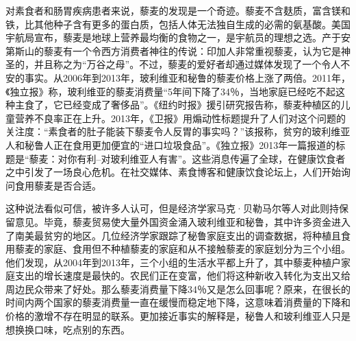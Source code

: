 \documentclass{exam-zh}
\begin{document}
\begin{material}[source={（摘编自赫克托·麦克唐纳《后真相时代》，刘清山译）}]
对素食者和肠胃疾病患者来说，藜麦的发现是一个奇迹。藜麦不含麸质，富含镁和铁，比其他种子含有更多的蛋白质，包括人体无法独自生成的必需的氨基酸。美国宇航局宣布，藜麦是地球上营养最均衡的食物之一，是宇航员的理想之选。产于安第斯山的藜麦有一个令西方消费者神往的传说：印加人非常重视藜麦，认为它是神圣的，并且称之为“万谷之母”。不过，藜麦的爱好者却通过媒体发现了一个令人不安的事实。从2006年到2013年，玻利维亚和秘鲁的藜麦价格上涨了两倍。2011年，《独立报》称，玻利维亚的藜麦消费量“5年间下降了34％，当地家庭已经吃不起这种主食了，它已经变成了奢侈品”。《纽约时报》援引研究报告称，藜麦种植区的儿童营养不良率正在上升。2013年，《卫报》用煽动性标题提升了人们对这个问题的关注度：“素食者的肚子能装下藜麦令人反胃的事实吗？”该报称，贫穷的玻利维亚人和秘鲁人正在食用更加便宜的“进口垃圾食品”。《独立报》2013年一篇报道的标题是“藜麦：对你有利--对玻利维亚人有害”。这些消息传遍了全球，在健康饮食者之中引发了一场良心危机。在社交媒体、素食博客和健康饮食论坛上，人们开始询问食用藜麦是否合适。

这种说法看似可信，被许多人认可，但是经济学家马克·贝勒马尔等人对此则持保留意见。毕竟，藜麦贸易使大量外国资金涌入玻利维亚和秘鲁，其中许多资金进入了南美最贫穷的地区。几位经济学家跟踪了秘鲁家庭支出的调查数据，将种植且食用藜麦的家庭、食用但不种植藜麦的家庭和从不接触藜麦的家庭划分为三个小组。他们发现，从2004年到2013年，三个小组的生活水平都上升了，其中藜麦种植户家庭支出的增长速度是最快的。农民们正在变富，他们将这种新收入转化为支出又给周边民众带来了好处。那么藜麦消费量下降34％又是怎么回事呢？原来，在很长的时间内两个国家的藜麦消费量一直在缓慢而稳定地下降，这意味着消费量的下降和价格的激增不存在明显的联系。更加接近事实的解释是，秘鲁人和玻利维亚人只是想换换口味，吃点别的东西。


\end{material}
\end{document}
